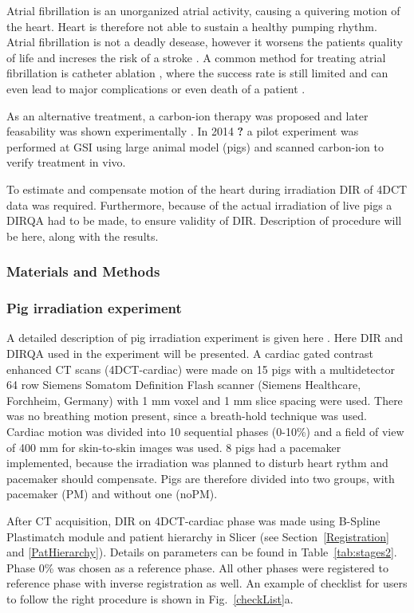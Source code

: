 \documentclass[type=dr, dr=rernat, accentcolor=tud7b,colorbacktitle, bigchapter, openright, twoside, 12pt ]{tudthesis}
\begin{document}
Atrial fibrillation is an unorganized atrial activity, causing a quivering motion of the heart. Heart is therefore not able to sustain a healthy pumping rhythm. Atrial fibrillation is not a
deadly desease, however it worsens the patients quality of life and increses the risk of a stroke \cite{Benjamin1998}. A common method for treating atrial fibrillation is catheter ablation \cite{January2014}, 
where the success rate is still limited and can even lead to major complications or even death of a patient \cite{Cappato2005,Cappato2010}.

As an alternative treatment, a carbon-ion therapy was proposed \cite{Bert2012} and later feasability was shown experimentally \cite{Lehmann2015b}. In 2014 \textbf{?} a pilot experiment was performed at GSI using large animal model (pigs) and
scanned carbon-ion to verify treatment in vivo.

To estimate and compensate motion of the heart during irradiation DIR of 4DCT data was required. Furthermore, because of the actual irradiation of live pigs a DIRQA had to be made, to ensure validity of DIR. Description of procedure will be here,
along with the results.


\subsubsection{Materials and Methods}


\subsubsection{Pig irradiation experiment}

A detailed description of pig irradiation experiment is given here \cite{Lehmann2015}. Here DIR and DIRQA used in the experiment will be presented. A cardiac gated contrast enhanced CT scans (4DCT-cardiac) were made on 15 pigs with a multidetector 64 row Siemens Somatom Definition Flash scanner 
(Siemens Healthcare, Forchheim, Germany) with 1 mm voxel and 1 mm slice spacing were used. There was no breathing motion present, since a breath-hold technique was used. Cardiac motion was divided into 10 sequential phases (0-10\%) and a field of view of 400 mm for skin-to-skin images was used.
8 pigs had a pacemaker implemented, because the irradiation was planned to disturb heart rythm and pacemaker should compensate. Pigs are therefore divided into two groups, with pacemaker (PM) and without one (noPM).

After CT acquisition, DIR on 4DCT-cardiac phase was made using B-Spline Plastimatch module and patient hierarchy in Slicer (see Section~\ref{Registration} and \ref{PatHierarchy}). Details on parameters can be found in Table~\ref{tab:stages2}. 
Phase 0\% was chosen as a reference phase. All other phases were registered to reference phase with inverse registration as well. An example of checklist for users to follow the right procedure is shown in Fig.~\ref{checkList}a.
\end{document}
